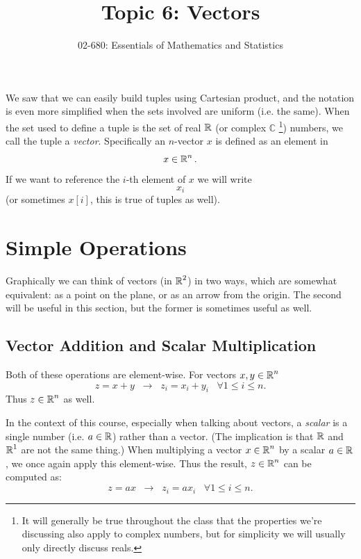 


\title{Topic 6: Vectors}
\author{02-680: Essentials of Mathematics and Statistics}


\maketitle

We saw that we can easily build tuples using Cartesian product, and the notation is even more simplified when the sets involved are uniform (i.e. the same). 
When the set used to define a tuple is the set of real $\operatorname{\mathbb{R}}$ (or complex $\mathbb{C}$%
\footnote{It will generally be true throughout the class that the properties we're discussing also apply to complex numbers, but for simplicity we will usually only directly discuss reals.})
numbers, we call the tuple a \emph{vector}.
Specifically an $n$-vector $x$ is defined as an element in \[x\in \operatorname{\mathbb{R}}^n.\] 
If we want to reference the $i$-th element of $x$ we will write \[x_i\] (or sometimes $x[i]$, this is true of tuples as well).

\section{Simple Operations}
Graphically we can think of vectors (in $\operatorname{\mathbb{R}}^2$) in two ways, which are somewhat equivalent: 
as a point on the plane, or as an arrow from the origin.
The second will be useful in this section, but the former is sometimes useful as well. 


\subsection{Vector Addition and Scalar Multiplication}
Both of these operations are element-wise. 
For vectors $x,y \in \operatorname{\mathbb{R}}^n$
\[
z = x+y \;\;\rightarrow \;\; z_i = x_i + y_i \;\;\; \forall 1 \le i \le n.
\]
Thus $z \in \operatorname{\mathbb{R}}^n$ as well. 

In the context of this course, especially when talking about vectors, a \emph{scalar} is a single number (i.e. $a \in \operatorname{\mathbb{R}}$) rather than a vector. 
(The implication is that $\operatorname{\mathbb{R}}$ and $\operatorname{\mathbb{R}}^1$ are not the same thing.)
When multiplying a vector $x\in \operatorname{\mathbb{R}}^n$ by a scalar $a\in\operatorname{\mathbb{R}}$, we once again apply this element-wise. 
Thus the result, $z\in\operatorname{\mathbb{R}}^n$ can be computed as:
\[
z = ax \;\; \rightarrow \;\; z_i = a x_i \;\;\; \forall 1 \le i \le n.
\]


